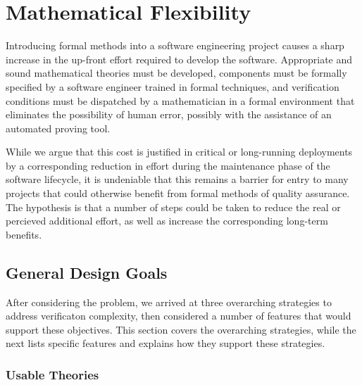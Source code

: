 


\chapter{Mathematical Flexibility\label{ch:math}}

Introducing formal methods into a software engineering project causes a sharp increase in the up-front effort required to develop the software.  Appropriate and sound mathematical theories must be developed, components must be formally specified by a software engineer trained in formal techniques, and verification conditions must be dispatched by a mathematician in a formal environment that eliminates the possibility of human error, possibly with the assistance of an automated proving tool.

While we argue that this cost is justified in critical or long-running deployments by a corresponding reduction in effort during the maintenance phase of the software lifecycle, it is undeniable that this remains a barrier for entry to many projects that could otherwise benefit from formal methods of quality assurance.  The hypothesis is that a number of steps could be taken to reduce the real or percieved additional effort, as well as increase the corresponding long-term benefits.

\section{General Design Goals\label{mathDesignGoals}}

After considering the problem, we arrived at three overarching strategies to address verificaton complexity, then considered a number of features that would support these objectives.  This section covers the overarching strategies, while the next lists specific features and explains how they support these strategies. 

	\subsection{Usable Theories\label{usableTheories}}

